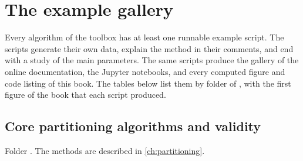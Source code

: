\chapter{The example gallery}\label{app:examples}
\begin{roadmap}
Every algorithm of the toolbox has at least one runnable example script. The scripts generate their own data, explain the method in their comments, and end with a study of the main parameters. The same scripts produce the gallery of the online documentation, the Jupyter notebooks, and every computed figure and code listing of this book. The tables below list them by folder of , with the first figure of the book that each script produced.
\end{roadmap}

\section[Core partitioning algorithms]{Core partitioning algorithms and validity}
Folder . The methods are described in \cref{ch:partitioning}.

